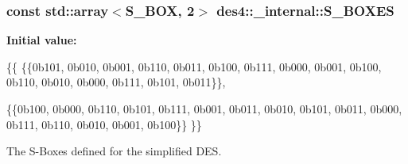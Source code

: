 \subsubsection[{\texorpdfstring{S\+\_\+\+B\+O\+X\+ES}{S_BOXES}}]{\setlength{\rightskip}{0pt plus 5cm}const std\+::array$<${\bf S\+\_\+\+B\+OX}, 2$>$ des4\+::\+\_\+internal\+::\+S\+\_\+\+B\+O\+X\+ES}\hypertarget{namespacedes4_1_1__internal_a3c053b7a73954a3551c27d43751018dd}{}\label{namespacedes4_1_1__internal_a3c053b7a73954a3551c27d43751018dd}
{\bfseries Initial value\+:}
\begin{DoxyCode}
\{\{
            \{\{0b101, 0b010, 0b001, 0b110, 0b011, 0b100, 0b111, 0b000, 
              0b001, 0b100, 0b110, 0b010, 0b000, 0b111, 0b101, 0b011\}\},

            \{\{0b100, 0b000, 0b110, 0b101, 0b111, 0b001, 0b011, 0b010,
              0b101, 0b011, 0b000, 0b111, 0b110, 0b010, 0b001, 0b100\}\}
        \}\}
\end{DoxyCode}


The S-\/\+Boxes defined for the simplified D\+ES. 

